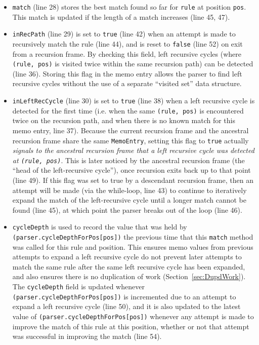 \documentclass[manuscript]{acmart}
\begin{document}
\begin{itemize}
    \item \texttt{match} (line 28) stores the best match found so far for \texttt{rule} at position \texttt{pos}. This match is updated if the length of a match increases (line 45, 47).
    
    \item \texttt{inRecPath} (line 29) is set to \texttt{true} (line 42) when an attempt is made to recursively match the rule (line 44), and is reset to \texttt{false} (line 52) on exit from a recursion frame. By checking this field, left recursive cycles (where \texttt{(rule, pos)} is visited twice within the same recursion path) can be detected (line 36). Storing this flag in the memo entry allows the parser to find left recursive cycles without the use of a separate ``visited set'' data structure.
    
    \item \texttt{inLeftRecCycle} (line 30) is set to \texttt{true} (line 38) when a left recursive cycle is detected for the first time (i.e. when the same \texttt{(rule, pos)} is encountered twice on the recursion path, and when there is no known match for this memo entry, line 37). Because the current recursion frame and the ancestral recursion frame share the same \texttt{MemoEntry}, setting this flag to \texttt{true} actually \emph{signals to the ancestral recursion frame that a left recursive cycle was detected at \texttt{(rule, pos)}}. This is later noticed by the ancestral recursion frame (the ``head of the left-recursive cycle''), once recursion exits back up to that point (line 49). If this flag was set to true by a descendant recursion frame, then an attempt will be made (via the while-loop, line 43) to continue to iteratively expand the match of the left-recursive cycle until a longer match cannot be found (line 45), at which point the parser breaks out of the loop (line 46).
    
    \item \texttt{cycleDepth} is used to record the value that was held by \texttt{(parser.cycleDepthForPos[pos])} the previous time that this \texttt{match} method was called for this rule and position. This ensures memo values from previous attempts to expand a left recursive cycle do not prevent later attempts to match the same rule after the same left recursive cycle has been expanded, and also ensures there is no duplication of work (Section~\ref{sec:DupdWork}). The \texttt{cycleDepth} field is updated whenever \texttt{(parser.cycleDepthForPos[pos])} is incremented due to an attempt to expand a left recursive cycle (line 50), and it is also updated to the latest value of \texttt{(parser.cycleDepthForPos[pos])} whenever any attempt is made to improve the match of this rule at this position, whether or not that attempt was successful in improving the match (line 54).
\end{itemize}
\end{document}
